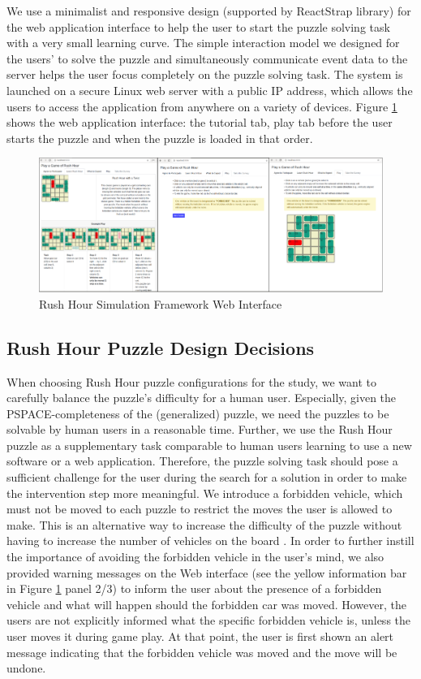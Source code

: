 We use a minimalist and responsive design (supported by ReactStrap library) for the web application interface to help the user to start the puzzle solving task with a very small learning curve. The simple interaction model we designed for the users' to solve the puzzle and simultaneously communicate event data to the server helps the user focus completely on the puzzle solving task. The system is launched on a secure Linux web server with a public IP address, which allows the users to access the application from anywhere on a variety of devices. Figure \ref{fig:ui} shows the web application interface: the tutorial tab, play tab before the user starts the puzzle and when the puzzle is loaded in that order.
\begin{figure}[!hbt]
  \centering
\includegraphics[width=\columnwidth]{img/UI.pdf}
  \caption{Rush Hour Simulation Framework Web Interface}
  \label{fig:ui}
\end{figure}
\subsection*{Rush Hour Puzzle Design Decisions}

When choosing Rush Hour puzzle configurations for the study, we want to carefully balance the puzzle's difficulty for a human user. Especially, given the PSPACE-completeness of the (generalized) puzzle, we need the puzzles to be solvable by human users in a reasonable time. Further, we use the Rush Hour puzzle as a supplementary task comparable to human users learning to use a new software or a web application. Therefore, the puzzle solving task should pose a sufficient challenge for the user during the search for a solution in order to make the intervention step more meaningful. We introduce a forbidden vehicle, which must not be moved to each puzzle to restrict the moves the user is allowed to make. This is an alternative way to increase the difficulty of the puzzle without having to increase the number of vehicles on the board \cite{fernau2003}. In order to further instill the importance of avoiding the forbidden vehicle in the user's mind, we also provided warning messages on the Web interface (see the yellow information bar in Figure \ref{fig:ui} panel 2/3) to inform the user about the presence of a forbidden vehicle and what will happen should the forbidden car was moved. However, the users are not explicitly informed what the specific forbidden vehicle is, unless the user moves it during game play. At that point, the user is first shown an alert message indicating that the forbidden vehicle was moved and the move will be undone.

